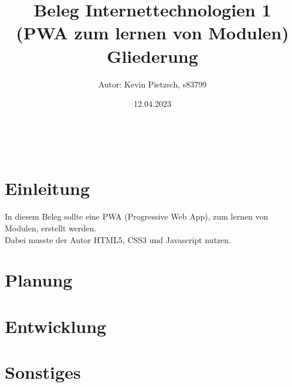 \documentclass[12pt, letterpaper]{article}
\begin{document}
	\begin{titlepage}
		\title{Beleg Internettechnologien 1 \\ (PWA zum lernen von Modulen) }
		\author{Autor: Kevin Pietzsch, s83799}
		\date{12.04.2023} %
		\maketitle
	\end{titlepage}
	
	\newpage
	\begin{center}
		\title{\Huge{Gliederung}}\\
	\end{center}
	
	\renewcommand\contentsname{Inhalt}
	\tableofcontents
	
	\newpage
	\section{Einleitung}
	In diesem Beleg sollte eine PWA (Progressive Web App), zum lernen von Modulen, erstellt werden.\\
	Dabei musste der Autor HTML5, CSS3 und Javascript nutzen.
	\newpage
	
	
	
	\section{Planung}

	\newpage	
	
	
	
	\section{Entwicklung}

	\newpage
	
	\section{Sonstiges}



	
\end{document}

